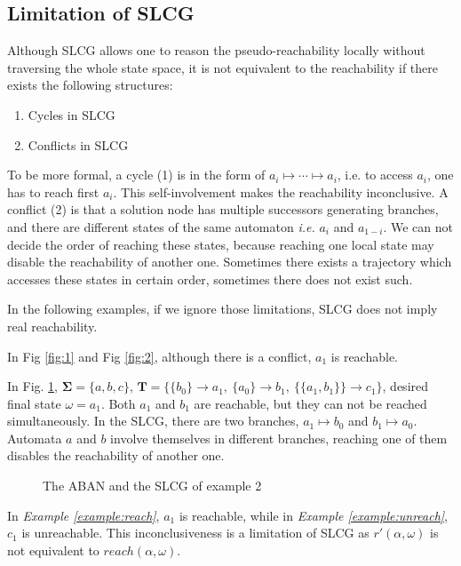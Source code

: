 \documentclass[runningheads]{llncs}
\newcommand{\acm}[3]{\{#1\}\rightarrow#3}
\begin{document}
\subsection{Limitation of SLCG}\label{limitation}
Although SLCG allows one to reason the pseudo-reachability locally without traversing the whole state space, it is not equivalent to the reachability if there exists the following structures:
\begin{enumerate}
\item Cycles in SLCG
\item Conflicts in SLCG

\end{enumerate}
To be more formal, a cycle (1) is in the form of $a_i\mapsto\cdots\mapsto a_i$, i.e. to access $a_i$, one has to reach first $a_i$. This self-involvement makes the reachability inconclusive. 
A conflict (2) is that a solution node has multiple successors generating branches, and there are different states of the same automaton \textit{i.e.} $a_i$ and $a_{1-i}$. 
We can not decide the order of reaching these states, because reaching one local state may disable the reachability of another one.
Sometimes there exists a trajectory which accesses these states in certain order, sometimes there does not exist such.

In the following examples, if we ignore those limitations, SLCG does not imply real reachability.


\begin{example}\label{example:reach}
In Fig \ref{fig:1} and 
Fig \ref{fig:2}, although there is a conflict, $a_1$ is reachable.
\end{example}

\begin{example}\label{example:unreach}
In Fig. \ref{fig:3}, $\mathbf{\Sigma}=\{a,b,c\}$, $\mathbf{T}=\{\acm{b_0}{a_0}{a_1},\ \acm{a_0}{b_0}{b_1},\ \acm{\{a_1,b_1\}}{c_0}{c_1}\}$,  desired final state $\omega=a_1$. 
Both $a_1$ and $b_1$ are reachable, but they can not be reached simultaneously.
In the SLCG, there are two branches, $a_1\mapsto b_0$ and $b_1\mapsto a_0$.
Automata $a$ and $b$ involve themselves in different branches, reaching one of them disables the reachability of another one.
\end{example}

\begin{figure}[ht]
\centering

\caption{The ABAN and the SLCG of example 2}
\label{fig:3}
\end{figure}
In \textit{Example \ref{example:reach}}, $a_1$ is reachable, while in \textit{Example \ref{example:unreach}}, $c_1$ is unreachable. This inconclusiveness is a limitation of SLCG as $r'(\alpha,\omega)$ is not equivalent to $reach(\alpha,\omega)$.
\end{document}
